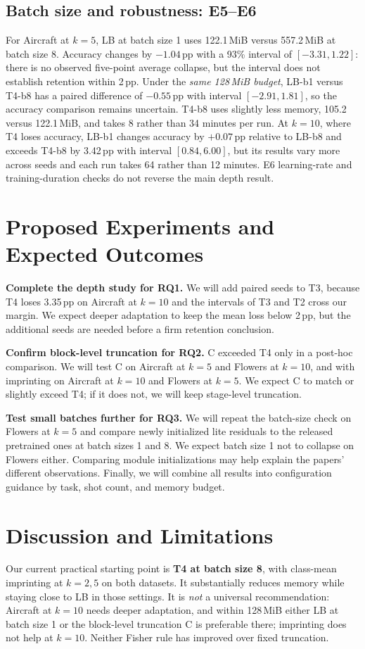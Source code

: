 \documentclass[sigconf,nonacm]{acmart}
\begin{document}
\subsection{Batch size and robustness: E5--E6}
For Aircraft at $k=5$, LB at batch size 1 uses 122.1\,MiB versus 557.2\,MiB at batch size 8. Accuracy changes by $-1.04$\,pp with a 93\% interval of $[-3.31,1.22]$: there is no observed five-point average collapse, but the interval does not establish retention within 2\,pp. Under the \emph{same 128\,MiB budget}, LB-b1 versus T4-b8 has a paired difference of $-0.55$\,pp with interval $[-2.91,1.81]$, so the accuracy comparison remains uncertain. T4-b8 uses slightly less memory, 105.2 versus 122.1\,MiB, and takes 8 rather than 34 minutes per run. At $k=10$, where T4 loses accuracy, LB-b1 changes accuracy by $+0.07$\,pp relative to LB-b8 and exceeds T4-b8 by 3.42\,pp with interval $[0.84,6.00]$, but its results vary more across seeds and each run takes 64 rather than 12 minutes. E6 learning-rate and training-duration checks do not reverse the main depth result.

\balance
\section{Proposed Experiments and Expected Outcomes}
\textbf{Complete the depth study for RQ1.} We will add paired seeds to T3, because T4 loses 3.35\,pp on Aircraft at $k=10$ and the intervals of T3 and T2 cross our margin. We expect deeper adaptation to keep the mean loss below 2\,pp, but the additional seeds are needed before a firm retention conclusion.

\textbf{Confirm block-level truncation for RQ2.} C exceeded T4 only in a post-hoc comparison. We will test C on Aircraft at $k=5$ and Flowers at $k=10$, and with imprinting on Aircraft at $k=10$ and Flowers at $k=5$. We expect C to match or slightly exceed T4; if it does not, we will keep stage-level truncation.

\textbf{Test small batches further for RQ3.} We will repeat the batch-size check on Flowers at $k=5$ and compare newly initialized lite residuals to the released pretrained ones at batch sizes 1 and 8. We expect batch size 1 not to collapse on Flowers either. Comparing module initializations may help explain the papers' different observations. Finally, we will combine all results into configuration guidance by task, shot count, and memory budget.

\section{Discussion and Limitations}
Our current practical starting point is \textbf{T4 at batch size 8}, with class-mean imprinting at $k=2,5$ on both datasets. It substantially reduces memory while staying close to LB in those settings. It is \emph{not} a universal recommendation: Aircraft at $k=10$ needs deeper adaptation, and within 128\,MiB either LB at batch size 1 or the block-level truncation C is preferable there; imprinting does not help at $k=10$. Neither Fisher rule has improved over fixed truncation.
\end{document}
